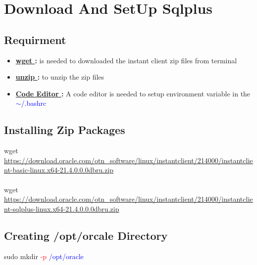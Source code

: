 \section{Download And SetUp Sqlplus}
\subsection{Requirment}
\begin{tcolorbox}[title =Download wget]
\begin{itemize}
    \item \textbf{\underline{wget }: } is needed to downloaded the instant client zip files from terminal
    \item \textbf{\underline{unzip }: } to unzip the zip files
\end{itemize}
\end{tcolorbox}
\begin{tcolorbox}[title =Code Editor]
  \begin{itemize}
      \item \textbf{\underline{Code Editor }: } A code editor is needed to setup environment variable in the \textcolor{blue}{$\sim$/.bashrc}
  \end{itemize}
\end{tcolorbox}
\subsection{Installing Zip Packages}
\begin{tcolorbox}[title=Download Links,width = \textwidth]
    \textcolor{greenCommand}{wget} \href{https://download.oracle.com/otn\_software/linux/instantclient/214000/instantclient-basic-linux.x64-21.4.0.0.0dbru.zip}{\underline{https://download.oracle.com/otn\_software/linux/instantclient/214000/instantclient-basic-linux.x64-21.4.0.0.0dbru.zip}} \\\\
    \textcolor{greenCommand}{wget} \href{https://download.oracle.com/otn\_software/linux/instantclient/214000/instantclient-sqlplus-linux.x64-21.4.0.0.0dbru.zip}{\underline{https://download.oracle.com/otn\_software/linux/instantclient/214000/instantclient-sqlplus-linux.x64-21.4.0.0.0dbru.zip}}
\end{tcolorbox}
\subsection{Creating /opt/orcale Directory}
\begin{tcolorbox}
    \textcolor{Sudo}{sudo} \textcolor{greenCommand}{mkdir} \textcolor{red}{-p} \textcolor{blue}{/opt/oracle}
\end{tcolorbox}
